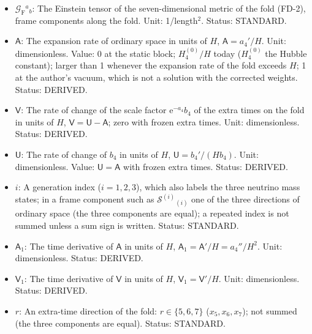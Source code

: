 \documentclass[
  10pt,
]{article}
\begin{document}
\begin{itemize}
  \(\kappa_7\): The gravitational coupling of the fold: with the
  corrected Lovelock weights the thin source of the fold equals, to
  second order in the rates of expansion, the Einstein tensor of the
  seven-dimensional metric of the fold divided by
  \(\kappa_7 = 15\kappa H/16\), and exactly so in the Friedmann
  equations of a fold with frozen extra times; four-dimensional gravity
  on the fold has \(8\pi G_{\mathrm{N}} = \kappa_7/V_*\) (plus the
  induced term, if the fields of the fold induce one). Unit:
  GeV\(^{-5}\). Value: \(15\kappa H/16\). Status: DERIVED.
\item
  \(\mathcal{G}_{\mathrm{F}}{}^a{}_b\): The Einstein tensor of the
  seven-dimensional metric of the fold (FD-2), frame components along
  the fold. Unit: 1/length\(^2\). Status: STANDARD.
\item
  \(\mathsf{A}\): The expansion rate of ordinary space in units of
  \(H\), \(\mathsf{A} = a_4'/H\). Unit: dimensionless. Value: 0 at the
  static block; \(H_4^{(0)}/H\) today (\(H_4^{(0)}\) the Hubble
  constant); larger than 1 whenever the expansion rate of the fold
  exceeds \(H\); 1 at the author's vacuum, which is not a solution with
  the corrected weights. Status: DERIVED.
\item
  \(\mathsf{V}\): The rate of change of the scale factor
  \(\mathrm{e}^{-a_4}b_4\) of the extra times on the fold in units of
  \(H\), \(\mathsf{V} = \mathsf{U} - \mathsf{A}\); zero with frozen
  extra times. Unit: dimensionless. Status: DERIVED.
\item
  \(\mathsf{U}\): The rate of change of \(b_4\) in units of \(H\),
  \(\mathsf{U} = b_4'/(Hb_4)\). Unit: dimensionless. Value:
  \(\mathsf{U} = \mathsf{A}\) with frozen extra times. Status: DERIVED.
\item
  \(i\): A generation index (\(i = 1, 2, 3\)), which also labels the
  three neutrino mass states; in a frame component such as
  \(\mathcal{S}^{(i)}{}_{(i)}\) one of the three directions of ordinary
  space (the three components are equal); a repeated index is not summed
  unless a sum sign is written. Status: STANDARD.
\item
  \(\mathsf{A}_1\): The time derivative of \(\mathsf{A}\) in units of
  \(H\), \(\mathsf{A}_1 = \mathsf{A}'/H = a_4''/H^2\). Unit:
  dimensionless. Status: DERIVED.
\item
  \(\mathsf{V}_1\): The time derivative of \(\mathsf{V}\) in units of
  \(H\), \(\mathsf{V}_1 = \mathsf{V}'/H\). Unit: dimensionless. Status:
  DERIVED.
\item
  \(r\): An extra-time direction of the fold: \(r \in \{5, 6, 7\}\)
  (\(x_5, x_6, x_7\)); not summed (the three components are equal).
  Status: STANDARD.
\end{itemize}
\end{document}
